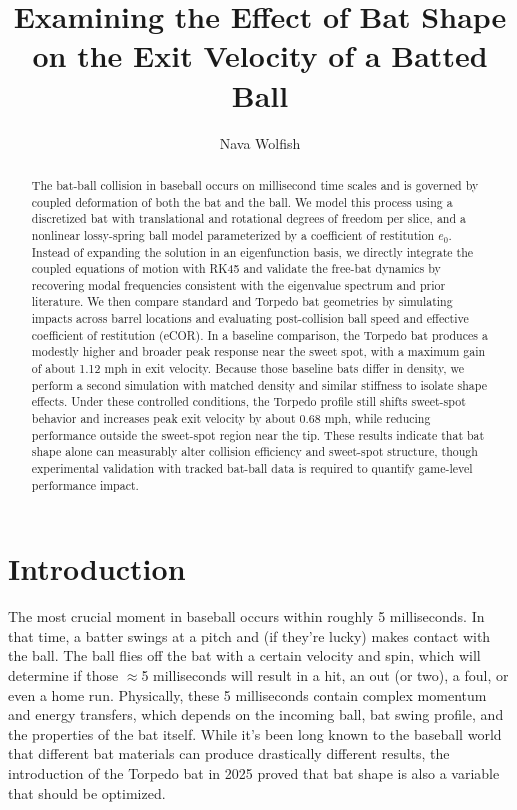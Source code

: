 \documentclass[linenumbers]{aastex7}
\begin{document}
\title{Examining the Effect of Bat Shape on the Exit Velocity of a Batted Ball}

\author{Nava Wolfish}

\begin{abstract}

The bat-ball collision in baseball occurs on millisecond time scales and is governed by coupled deformation of both the bat and the ball. We model this process using a discretized bat with translational and rotational degrees of freedom per slice, and a nonlinear lossy-spring ball model parameterized by a coefficient of restitution $e_0$. Instead of expanding the solution in an eigenfunction basis, we directly integrate the coupled equations of motion with RK45 and validate the free-bat dynamics by recovering modal frequencies consistent with the eigenvalue spectrum and prior literature. We then compare standard and Torpedo bat geometries by simulating impacts across barrel locations and evaluating post-collision ball speed and effective coefficient of restitution (eCOR). In a baseline comparison, the Torpedo bat produces a modestly higher and broader peak response near the sweet spot, with a maximum gain of about 1.12 mph in exit velocity. Because those baseline bats differ in density, we perform a second simulation with matched density and similar stiffness to isolate shape effects. Under these controlled conditions, the Torpedo profile still shifts sweet-spot behavior and increases peak exit velocity by about 0.68 mph, while reducing performance outside the sweet-spot region near the tip. These results indicate that bat shape alone can measurably alter collision efficiency and sweet-spot structure, though experimental validation with tracked bat-ball data is required to quantify game-level performance impact.

\end{abstract}

\keywords{}

\section{Introduction}
The most crucial moment in baseball occurs within roughly 5 milliseconds. In that time, a batter swings at a pitch and (if they're lucky) makes contact with the ball. The ball flies off the bat with a certain velocity and spin, which will determine if those $\approx$5 milliseconds will result in a hit, an out (or two), a foul, or even a home run. Physically, these 5 milliseconds contain complex momentum and energy transfers, which depends on the incoming ball, bat swing profile, and the properties of the bat itself. While it's been long known to the baseball world that different bat materials can produce drastically different results, the introduction of the Torpedo bat in 2025 proved that bat shape is also a variable that should be optimized.
\end{document}
